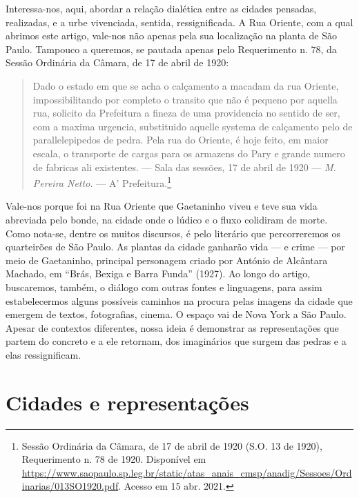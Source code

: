\begin{refsection}
    Interessa-nos, aqui, abordar a relação dialética entre as cidades pensadas, realizadas, e a urbe vivenciada, sentida, ressignificada. A Rua Oriente, com a qual abrimos este artigo, vale-nos não apenas pela sua localização na planta de São Paulo. Tampouco a queremos, se pautada apenas pelo Requerimento n. 78, da Sessão Ordinária da Câmara, de 17 de abril de 1920:

    \begin{quotation}
        Dado o estado em que se acha o calçamento a macadam da rua Oriente, impossibilitando por completo o transito que não é pequeno por aquella rua, solicito da Prefeitura a fineza de uma providencia no sentido de ser, com a maxima urgencia, substituido aquelle systema de calçamento pelo de parallelepipedos de pedra. Pela rua do Oriente, é hoje feito, em maior escala, o transporte de cargas para os armazens do Pary e grande numero de fabricas ali existentes. --- Sala das sessões, 17 de abril de 1920 --- \textit{M. Pereira Netto.} --- A' Prefeitura.\footnote{Sessão Ordinária da Câmara, de 17 de abril de 1920 (S.O. 13 de 1920), Requerimento n. 78 de 1920. Disponível em \url{https://www.saopaulo.sp.leg.br/static/atas_anais_cmsp/anadig/Sessoes/Ordinarias/013SO1920.pdf}. Acesso em 15 abr. 2021.}
    \end{quotation}

    Vale-nos porque foi na Rua Oriente que Gaetaninho viveu e teve sua vida abreviada pelo bonde, na cidade onde o lúdico e o fluxo colidiram de morte. Como nota-se, dentre os muitos discursos, é pelo literário que percorreremos os quarteirões de São Paulo. As plantas da cidade ganharão vida --- e crime --- por meio de Gaetaninho, principal personagem criado por António de Alcântara Machado, em ``Brás, Bexiga e Barra Funda'' (1927). Ao longo do artigo, buscaremos, também, o diálogo com outras fontes e linguagens, para assim estabelecermos alguns possíveis caminhos na procura pelas imagens da cidade que emergem de textos, fotografias, cinema. O espaço vai de Nova York a São Paulo. Apesar de contextos diferentes, nossa ideia é demonstrar as representações que partem do concreto e a ele retornam, dos imaginários que surgem das pedras e a elas ressignificam.

    \section{Cidades e representações}


\end{refsection}
